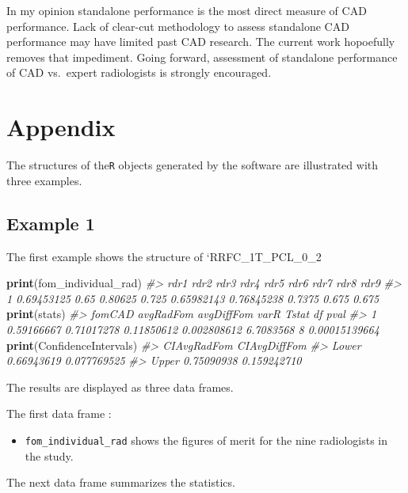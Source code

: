 \documentclass[
]{book}
\newenvironment{Shaded}{\begin{snugshade}}{\end{snugshade}}
\newcommand{\CommentTok}[1]{\textcolor[rgb]{0.56,0.35,0.01}{\textit{#1}}}
\newcommand{\KeywordTok}[1]{\textcolor[rgb]{0.13,0.29,0.53}{\textbf{#1}}}
\newcommand{\NormalTok}[1]{#1}
\providecommand{\tightlist}{%
  \setlength{\itemsep}{0pt}\setlength{\parskip}{0pt}}
\begin{document}
In my opinion standalone performance is the most direct measure of CAD performance. Lack of clear-cut methodology to assess standalone CAD performance may have limited past CAD research. The current work hopoefully removes that impediment. Going forward, assessment of standalone performance of CAD vs.~expert radiologists is strongly encouraged.

\hypertarget{standalone-cad-radiologists-appendix}{%
\section{Appendix}\label{standalone-cad-radiologists-appendix}}

The structures of the\texttt{R} objects generated by the software are illustrated with three examples.

\hypertarget{example-1-1}{%
\subsection{Example 1}\label{example-1-1}}

The first example shows the structure of `RRFC\_1T\_PCL\_0\_2

\begin{Shaded}
\begin{Highlighting}[]
\KeywordTok{print}\NormalTok{(fom_individual_rad)}
\CommentTok{#>         rdr1 rdr2    rdr3  rdr4       rdr5       rdr6   rdr7  rdr8  rdr9}
\CommentTok{#> 1 0.69453125 0.65 0.80625 0.725 0.65982143 0.76845238 0.7375 0.675 0.675}
\KeywordTok{print}\NormalTok{(stats)}
\CommentTok{#>       fomCAD  avgRadFom avgDiffFom        varR     Tstat df          pval}
\CommentTok{#> 1 0.59166667 0.71017278 0.11850612 0.002808612 6.7083568  8 0.00015139664}
\KeywordTok{print}\NormalTok{(ConfidenceIntervals)}
\CommentTok{#>       CIAvgRadFom CIAvgDiffFom}
\CommentTok{#> Lower  0.66943619  0.077769525}
\CommentTok{#> Upper  0.75090938  0.159242710}
\end{Highlighting}
\end{Shaded}

The results are displayed as three data frames.

The first data frame :

\begin{itemize}
\tightlist
\item
  \texttt{fom\_individual\_rad} shows the figures of merit for the nine radiologists in the study.
\end{itemize}

The next data frame summarizes the statistics.
\end{document}
